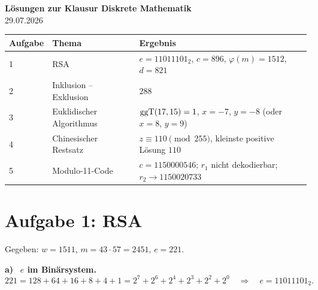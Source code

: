 
\usepackage[a4paper,margin=2.2cm]{geometry}
\usepackage{fancyhdr}
\usepackage{xcolor}
\usepackage[most]{tcolorbox}
\pagestyle{fancy}\fancyhf{}
\setlength{\parindent}{0pt}\setlength{\parskip}{4pt}
\setcounter{secnumdepth}{1}

\newcommand{\teil}[1]{\par\medskip\textbf{#1)}\ }



\begin{center}
{\LARGE\bfseries Lösungen zur Klausur Diskrete Mathematik}\\[4pt]
{\large 29.07.2026}
\end{center}

\begin{center}
\begin{tabular}{@{}lll@{}}
\toprule
Aufgabe & Thema & Ergebnis\\
\midrule
1 & RSA & $e = 11011101_2$, $c = 896$, $\varphi(m) = 1512$, $d = 821$\\
2 & Inklusion -- Exklusion & $288$\\
3 & Euklidischer Algorithmus & $\operatorname{ggT}(17,15) = 1$, $x = -7$, $y = -8$ (oder $x = 8$, $y = 9$)\\
4 & Chinesischer Restsatz & $z \equiv 110 \pmod{255}$, kleinste positive Lösung $110$\\
5 & Modulo-11-Code & $c = 1150000546$; $r_1$ nicht dekodierbar; $r_2 \to 1150020733$\\
\bottomrule
\end{tabular}
\end{center}

\section*{Aufgabe 1: RSA}
Gegeben: $w = 1511$, $m = 43 \cdot 57 = 2451$, $e = 221$.

\teil{a} \textbf{$e$ im Binärsystem.}
\[
221 = 128 + 64 + 16 + 8 + 4 + 1 = 2^7 + 2^6 + 2^4 + 2^3 + 2^2 + 2^0
\quad\Rightarrow\quad e = 11011101_2 .
\]

